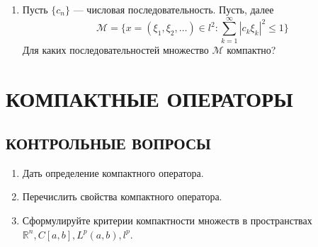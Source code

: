 \documentclass[12pt,a4paper]{article}
\begin{document}
\begin{enumerate}
\item Пусть $\{c_{n}\}$ — числовая последовательность. Пусть, далее
$$ \mathcal{M} = \{x = (\xi_{1}, \xi_{2}, \dots) \in l^{2} : \sum_{k=1}^{\infty} |c_{k}\xi_{k}|^{2} \le 1\} $$
Для каких последовательностей множество $\mathcal{M}$ компактно?
\end{enumerate}

\section{КОМПАКТНЫЕ ОПЕРАТОРЫ}

\subsection*{КОНТРОЛЬНЫЕ ВОПРОСЫ}
\begin{enumerate}
\item Дать определение компактного оператора.
\item Перечислить свойства компактного оператора.
\item Сформулируйте критерии компактности множеств в пространствах $\mathbb{R}^{n}, C[a,b], L^{p}(a,b), l^{p}$.
\end{enumerate}
\end{document}
